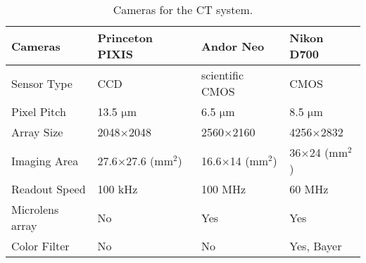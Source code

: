 

\begin{table}[h]
\small
\begin{center}
	\begin{tabular}{l | C{3cm} | C{3 cm} | C{3 cm} }
	\hline
	\hline
	Cameras & Princeton PIXIS & Andor Neo & Nikon D700 \\
	\hline

	Sensor Type & CCD & scientific CMOS & CMOS \\
	\hline
	Pixel Pitch & 13.5 $\mathrm{\mu m}$  & 6.5 $\mathrm{\mu m}$  & 8.5 $\mathrm{\mu m}$  \\
	\hline
	Array Size & 2048$\times$2048 & 2560$\times$2160 & 4256$\times$2832 \\
	\hline
	Imaging Area  & 27.6$\times$27.6 ($\mathrm{mm^2}$) & 16.6$\times$14 ($\mathrm{mm^2}$) & 36$\times$24 ($\mathrm{mm^2}$)  \\
	\hline
	Readout Speed & 100 kHz & 100 MHz & 60 MHz \\
	\hline
	Microlens array & No & Yes & Yes \\
	\hline
	Color Filter & No & No & Yes, Bayer \\
	\hline
	\hline
	\end{tabular}
\end{center}
\caption{Cameras for the CT system.}
\label{table:cameras}
\end{table}




